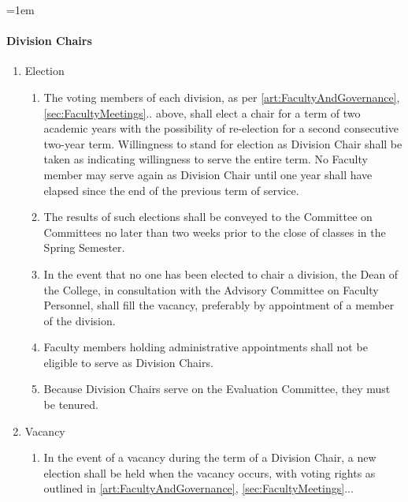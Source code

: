 \documentclass{manual}
\let\oldparagraph\paragraph
\renewcommand\paragraph{\leftskip=1em\oldparagraph}
\newcommand{\itemLevelA}{\alph*.}
\newcommand{\itemLevelB}{\arabic*)}
\newcommand{\itemRefA}{\alph*}
\newcommand{\itemRefB}{\arabic*}
\begin{document}
\paragraph{Division Chairs}\label{par:DivisionChairs}
\begin{enumerate}[label=\itemLevelA,ref=\itemRefA]

\item Election
\begin{enumerate}[label=\itemLevelB,ref=\itemRefB]

\item The voting members of each division, as per \cref{art:FacultyAndGovernance}, \cref{sec:FacultyMeetings}.. above, shall elect a chair for a term of two academic years with the possibility of re-election for a second consecutive two-year term. Willingness to stand for election as Division Chair shall be taken as indicating willingness to serve the entire term. No Faculty member may serve again as Division Chair until one year shall have elapsed since the end of the previous term of service.

\item The results of such elections shall be conveyed to the Committee on Committees no later than two weeks prior to the close of classes in the Spring Semester.

\item In the event that no one has been elected to chair a division, the Dean of the College, in consultation with the Advisory Committee on Faculty Personnel, shall fill the vacancy, preferably by appointment of a member of the division.

\item Faculty members holding administrative appointments shall not be eligible to serve as Division Chairs.

\item  Because Division Chairs serve on the Evaluation Committee, they must be tenured.
\end{enumerate}


\item Vacancy
\begin{enumerate}[label=\itemLevelB,ref=\itemRefB]

\item In the event of a vacancy during the term of a Division Chair, a new election shall be held when the vacancy occurs, with voting rights as outlined in \cref{art:FacultyAndGovernance}, \cref{sec:FacultyMeetings}...


\end{enumerate}
\end{enumerate}
\end{document}
